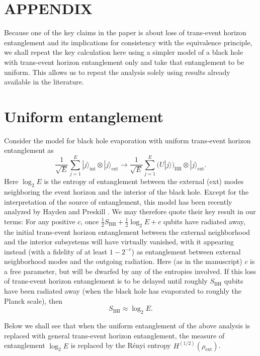 \documentclass[aps,12pt]{revtex4}
\begin{document}
\section*{APPENDIX}

Because one of the key claims in the paper is about loss of trans-event
horizon entanglement and its implications for consistency with the
equivalence principle, we shall repeat the key calculation here
using a simpler model of a black hole with trans-event horizon
entanglement only and take that entanglement to be uniform. This
allows us to repeat the analysis solely using results already available in
the literature.
\section{Uniform entanglement}

Consider the model for black hole evaporation with uniform trans-event
horizon entanglement as
\begin{equation}
\frac{1}{\sqrt{E}}\sum_{j=1}^{E}
|j\rangle_{\text{int}}\otimes|j\rangle_{\text{ext}}\rightarrow
\frac{1}{\sqrt{E}}\sum_{j=1}^{E}
(U|j\rangle)_{\text{BR}} \otimes|j\rangle_{\text{ext}}.
\end{equation}
Here $\log_2 E$ is the entropy of entanglement between the external (ext)
modes neighboring the event horizon and the interior of the black
hole. Except for the interpretation of the source of entanglement,
this model has been recently analyzed by Hayden and Preskill
\cite{Hayden07}.
We may therefore quote their key result in our terms: For any
positive $c$, once $\frac{1}{2} S_{\text{BH}}+\frac{1}{2} \log_2 E + c$
qubits have radiated away, the initial trans-event horizon entanglement
between the external neighborhood and the interior subsystems will
have virtually vanished, with it appearing instead (with a fidelity of
at least $1-2^{-c}$) as entanglement between external neighborhood
modes and the outgoing radiation. Here (as in the manuscript) $c$
is a free parameter, but will be dwarfed by any of the entropies
involved. If this loss of trans-event horizon entanglement is to be
delayed until roughly $S_{\text{BH}}$ qubits have been radiated away
(when the black hole has evaporated to roughly the Planck scale), then 
\begin{equation}
S_{\text{BH}}\approx \log_2 E.
\end{equation}

Below we shall see that when the uniform entanglement of the above analysis
is replaced with general trans-event horizon entanglement, the measure
of entanglement $\log_2 E$ is replaced by the R\'enyi entropy
$H^{(1/2)}(\rho_{\text{ext}})$.
\end{document}

